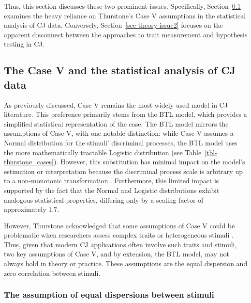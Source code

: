 \documentclass[
  authoryear,
  review,
  1p]{elsarticle}
\begin{document}
Thus, this section discusses these two prominent issues. Specifically,
Section~\ref{sec-theory-issue1} examines the heavy reliance on
Thurstone's Case V assumptions in the statistical analysis of CJ data.
Conversely, Section~\ref{sec-theory-issue2} focuses on the apparent
disconnect between the approaches to trait measurement and hypothesis
testing in CJ.

\subsection{The Case V and the statistical analysis of CJ
data}\label{sec-theory-issue1}

As previously discussed, Case V remains the most widely used model in CJ
literature. This preference primarily stems from the BTL model, which
provides a simplified statistical representation of the case. The BTL
model mirrors the assumptions of Case V, with one notable distinction:
while Case V assumes a Normal distribution for the stimuli' discriminal
processes, the BTL model uses the more mathematically tractable Logistic
distribution \citep[pp.~254]{Andrich_1978, Bramley_2008} (see
Table~\ref{tbl-thurstone_cases}). However, this substitution has minimal
impact on the model's estimation or interpretation because the
discriminal process scale is arbitrary up to a non-monotonic
transformation
\citetext{\citealp[pp.~16]{vanderLinden_et_al_2017_I}; \citealp{McElreath_2021}}.
Furthermore, this limited impact is supported by the fact that the
Normal and Logistic distributions exhibit analogous statistical
properties, differing only by a scaling factor of approximately \(1.7\).

However, Thurstone acknowledged that some assumptions of Case V could be
problematic when researchers assess complex traits or heterogeneous
stimuli \citep[pp.~376]{Thurstone_1927a}. Thus, given that modern CJ
applications often involve such traits and stimuli, two key assumptions
of Case V, and by extension, the BTL model, may not always hold in
theory or practice. These assumptions are the equal dispersion and zero
correlation between stimuli.

\subsubsection{The assumption of equal dispersions between
stimuli}\label{sec-theory-issue1a}
\end{document}
